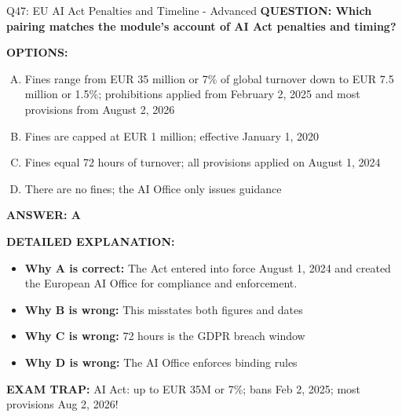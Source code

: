 \documentclass[8pt]{beamer}
\begin{document}
\begin{frame}[shrink=6]{Q47: EU AI Act Penalties and Timeline - Advanced}
\fontsize{6.5}{7.5}\selectfont
\textbf{QUESTION: Which pairing matches the module's account of AI Act penalties and timing?}

\vspace{0.1cm}
\textbf{OPTIONS:}
\begin{enumerate}[A.]
\item Fines range from EUR 35 million or 7\% of global turnover down to EUR 7.5 million or 1.5\%; prohibitions applied from February 2, 2025 and most provisions from August 2, 2026
\item Fines are capped at EUR 1 million; effective January 1, 2020
\item Fines equal 72 hours of turnover; all provisions applied on August 1, 2024
\item There are no fines; the AI Office only issues guidance
\end{enumerate}

\vspace{0.1cm}
\textcolor{myblue}{\textbf{ANSWER: A}}

\vspace{0.1cm}
\textbf{DETAILED EXPLANATION:}
\begin{itemize}
\item \textbf{Why A is correct:} The Act entered into force August 1, 2024 and created the European AI Office for compliance and enforcement.
\item \textbf{Why B is wrong:} This misstates both figures and dates
\item \textbf{Why C is wrong:} 72 hours is the GDPR breach window
\item \textbf{Why D is wrong:} The AI Office enforces binding rules
\end{itemize}

\textcolor{myred}{\textbf{EXAM TRAP:}} AI Act: up to EUR 35M or 7\%; bans Feb 2, 2025; most provisions Aug 2, 2026!
\end{frame}
\end{document}
